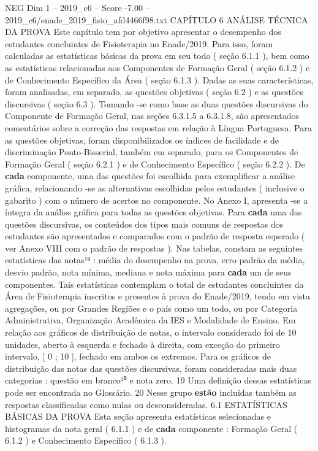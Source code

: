 \begin{textsample}{NEG Dim 1 – 2019\_c6 – Score -7.00 – 2019\_c6/enade\_2019\_fisio\_afd4466f98.txt}  \label{ex:f1_neg_091}
CAPÍTULO 6 ANÁLISE TÉCNICA DA PROVA Este capítulo tem por objetivo apresentar o desempenho dos estudantes concluintes de Fisioterapia no Enade/2019.
Para isso, foram calculadas as estatísticas básicas da prova em seu todo ( seção 6.1.1 ), bem como as estatísticas relacionadas aos Componentes de Formação Geral ( seção 6.1.2 ) e de Conhecimento Específico da Área ( seção 6.1.3 ).
Dadas as suas características, foram analisadas, em separado, as questões objetivas ( seção 6.2 ) e as questões discursivas ( seção 6.3 ).
Tomando -se como base as duas questões discursivas do Componente de Formação Geral, nas seções 6.3.1.5 a 6.3.1.8, são apresentados comentários sobre a correção das respostas em relação à Língua Portuguesa.
Para as questões objetivas, foram disponibilizados os índices de facilidade e de discriminação Ponto-Bisserial, também em separado, para os Componentes de Formação Geral ( seção 6.2.1 ) e de Conhecimento Específico ( seção 6.2.2 ).
De \textbf{cada} componente, uma das questões foi escolhida para exemplificar a análise gráfica, relacionando -se as alternativas escolhidas pelos estudantes ( inclusive o gabarito ) com o número de acertos no componente.
No Anexo I, apresenta -se a íntegra da análise gráfica para todas as questões objetivas.
Para \textbf{cada} uma das questões discursivas, os conteúdos dos tipos mais comuns de respostas dos estudantes são apresentados e comparados com o padrão de resposta esperado ( ver Anexo VIII com o padrão de respostas ).
Nas tabelas, constam as seguintes estatísticas das notas¹⁹ : média do desempenho na prova, erro padrão da média, desvio padrão, nota mínima, mediana e nota máxima para \textbf{cada} um de seus componentes.
Tais estatísticas contemplam o total de estudantes concluintes da Área de Fisioterapia inscritos e presentes à prova do Enade/2019, tendo em vista agregações, ou por Grandes Regiões e o país como um todo, ou por Categoria Administrativa, Organização Acadêmica da IES e Modalidade de Ensino.
Em relação aos gráficos de distribuição de notas, o intervalo considerado foi de 10 unidades, aberto à esquerda e fechado à direita, com exceção do primeiro intervalo, [ 0 ; 10 ], fechado em ambos os extremos.
Para os gráficos de distribuição das notas das questões discursivas, foram consideradas mais duas categorias : questão em branco²⁰ e nota zero. 19 Uma definição dessas estatísticas pode ser encontrada no Glossário. 20 Nesse grupo \textbf{estão} incluídas também as respostas classificadas como nulas ou desconsideradas. 6.1 ESTATÍSTICAS BÁSICAS DA PROVA Esta seção apresenta estatísticas selecionadas e histogramas da nota geral ( 6.1.1 ) e de \textbf{cada} componente : Formação Geral ( 6.1.2 ) e Conhecimento Específico ( 6.1.3 ).

\end{textsample}
